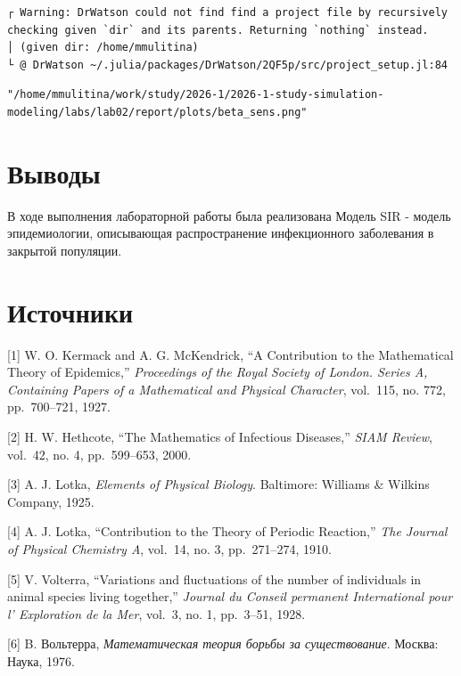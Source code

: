 \documentclass[
  english,
  russian,
  12pt,
  a4paper,
  DIV=11,
  numbers=noendperiod]{scrartcl}
\begin{document}
\begin{verbatim}
┌ Warning: DrWatson could not find find a project file by recursively checking given `dir` and its parents. Returning `nothing` instead.
│ (given dir: /home/mmulitina)
└ @ DrWatson ~/.julia/packages/DrWatson/2QF5p/src/project_setup.jl:84
\end{verbatim}

\begin{verbatim}
"/home/mmulitina/work/study/2026-1/2026-1-study-simulation-modeling/labs/lab02/report/plots/beta_sens.png"
\end{verbatim}

\section{Выводы}\label{ux432ux44bux432ux43eux434ux44b}

В ходе выполнения лабораторной работы была реализована Модель SIR -
модель эпидемиологии, описывающая распространение инфекционного
заболевания в закрытой популяции.

\section{Источники}\label{ux438ux441ux442ux43eux447ux43dux438ux43aux438}

{[}1{]} W. O. Kermack and A. G. McKendrick, ``A Contribution to the
Mathematical Theory of Epidemics,'' \emph{Proceedings of the Royal
Society of London. Series A, Containing Papers of a Mathematical and
Physical Character}, vol.~115, no. 772, pp.~700--721, 1927.

{[}2{]} H. W. Hethcote, ``The Mathematics of Infectious Diseases,''
\emph{SIAM Review}, vol.~42, no. 4, pp.~599--653, 2000.

{[}3{]} A. J. Lotka, \emph{Elements of Physical Biology}. Baltimore:
Williams \& Wilkins Company, 1925.

{[}4{]} A. J. Lotka, ``Contribution to the Theory of Periodic
Reaction,'' \emph{The Journal of Physical Chemistry A}, vol.~14, no. 3,
pp.~271--274, 1910.

{[}5{]} V. Volterra, ``Variations and fluctuations of the number of
individuals in animal species living together,'' \emph{Journal du
Conseil permanent International pour l' Exploration de la Mer}, vol.~3,
no. 1, pp.~3--51, 1928.

{[}6{]} B. Вольтерра, \emph{Математическая теория борьбы за
существование}. Москва: Наука, 1976.
\end{document}
